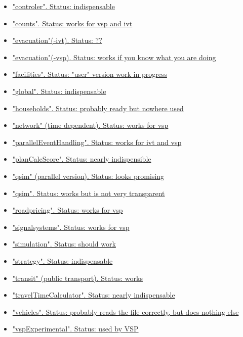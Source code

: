 \documentclass[a4paper,11pt]{report}
\begin{document}
\begin{itemize}
\begin{itemize}
\begin{itemize}
\begin{itemize}
	\item \href{http://www.matsim.org/node/389}{"controler". Status: indispensable}
	\item \href{http://www.matsim.org/docs/userguide/usingCounts}{"counts". Status: works for vsp and ivt}
	\item \href{http://www.matsim.org/node/525}{"evacuation"(-ivt). Status: ??}
	\item \href{http://www.matsim.org/node/391}{"evacuation"(-vsp). Status: works if you know what you are doing}
	\item \href{http://www.matsim.org/node/393}{"facilities". Status: "user" version work in progress}
	\item \href{http://www.matsim.org/node/392}{"global". Status: indispensable}
	\item \href{http://www.matsim.org/node/394}{"households". Status: probably ready but nowhere used}
	\item \href{http://www.matsim.org/node/222}{"network" (time dependent). Status: works for vsp}
	\item \href{http://www.matsim.org/node/460}{"parallelEventHandling". Status: works for ivt and vsp}
	\item \href{http://www.matsim.org/node/396}{"planCalcScore". Status: nearly indispensible}
	\item \href{http://www.matsim.org/node/378}{"qsim" (parallel version). Status: looks promising}
	\item \href{http://www.matsim.org/node/397}{"qsim". Status: works but is not very transparent}
	\item \href{http://www.matsim.org/node/383}{"roadpricing".  Status: works for vsp}
	\item \href{http://www.matsim.org/node/384}{"signalsystems". Status: works for vsp}
	\item \href{http://www.matsim.org/node/398}{"simulation". Status: should work}
	\item \href{http://www.matsim.org/node/400}{"strategy". Status: indispensable}
	\item \href{http://www.matsim.org/node/385}{"transit" (public transport).  Status: works}
	\item \href{http://www.matsim.org/node/401}{"travelTimeCalculator". Status: nearly indispensable}
	\item \href{http://www.matsim.org/node/515}{"vehicles". Status: probably reads the file correctly, but does nothing else}
	\item \href{http://www.matsim.org/node/630}{"vspExperimental". Status: used by VSP}

\end{itemize}
\end{itemize}
\end{itemize}
\end{itemize}
\end{document}
